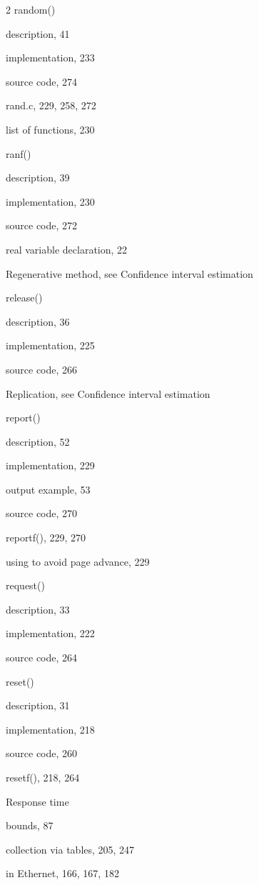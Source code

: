 \begin{multicols}{2}
\noindent random()\par
\quad description, 41\par
\quad implementation, 233\par
\quad source code, 274\par
\noindent rand.c, 229, 258, 272\par
\quad list of functions, 230\par
\noindent ranf()\par
\quad description, 39\par
\quad implementation, 230\par
\quad source code, 272\par
\noindent real variable declaration, 22\par
\columnbreak
\noindent Regenerative method, see Confidence interval estimation\par
\noindent release()\par
\quad description, 36\par
\quad implementation, 225\par
\quad source code, 266\par
\noindent Replication, see Confidence interval estimation\par
\noindent report()\par
\quad description, 52\par
\quad implementation, 229\par
\quad output example, 53\par
\quad source code, 270\par
\noindent reportf(), 229, 270\par
\quad using to avoid page advance, 229\par
\noindent request()\par
\quad description, 33\par
\quad implementation, 222\par
\quad source code, 264\par
\noindent reset()\par
\quad description, 31\par
\quad implementation, 218\par
\quad source code, 260\par
\noindent resetf(), 218, 264\par
\noindent Response time\par
\quad bounds, 87\par
\quad collection via tables, 205, 247\par
\quad in Ethernet, 166, 167, 182\par

\end{multicols}
